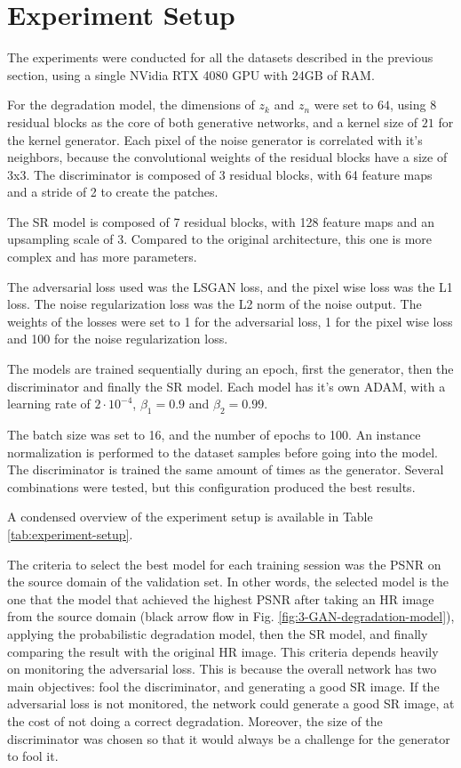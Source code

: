 \section{Experiment Setup}

The experiments were conducted for all the datasets described in the previous section, using a single NVidia RTX 4080 GPU with 24GB of RAM.

For the degradation model, the dimensions of $z_k$ and $z_n$ were set to $64$, using 8 residual blocks as the core of both generative networks, and a kernel size of $21$ for the kernel generator. Each pixel of the noise generator is correlated with it's neighbors, because the convolutional weights of the residual blocks have a size of 3x3. The discriminator is composed of 3 residual blocks, with 64 feature maps and a stride of 2 to create the patches.

The SR model is composed of 7 residual blocks, with 128 feature maps and an upsampling scale of 3. Compared to the original architecture, this one is more complex and has more parameters.

The adversarial loss used was the LSGAN loss, and the pixel wise loss was the L1 loss. The noise regularization loss was the L2 norm of the noise output. The weights of the losses were set to 1 for the adversarial loss, 1 for the pixel wise loss and 100 for the noise regularization loss.

The models are trained sequentially during an epoch, first the generator, then the discriminator and finally the SR model. Each model has it's own ADAM, with a learning rate of $2 \cdot 10^{-4}$,
 $\beta_1 = 0.9$ and $\beta_2 = 0.99$.

The batch size was set to 16, and the number of epochs to 100. An instance normalization is performed to the dataset samples before going into the model. 
The discriminator is trained the same amount of times as the generator. Several combinations were tested, but this configuration produced the best results.

A condensed overview of the experiment setup is available in Table \ref{tab:experiment-setup}.

The criteria to select the best model for each training session was the PSNR on the source domain of the validation set. 
In other words, the selected model is the one that the model that achieved the highest PSNR after taking an HR image from the source domain (black arrow flow in Fig. \ref{fig:3-GAN-degradation-model}), applying the probabilistic degradation model, then the SR model, and finally comparing the result with the original HR image.
This criteria depends heavily on monitoring the adversarial loss. This is because the overall network has two main objectives: fool the discriminator, and generating a good SR image. If the adversarial loss is not monitored, the network could generate a good SR image, at the cost of not doing a correct degradation. Moreover, the size of the discriminator was chosen so that it would always be a challenge for the generator to fool it.


